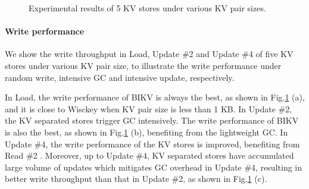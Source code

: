 \documentclass[sigconf]{acmart}
\begin{document}
\begin{figure} [!t]
	\setlength{\abovecaptionskip}{0.cm}	
	\setlength{\belowcaptionskip}{-0.cm}
	\centering
	\caption{Experimental results of 5 KV stores under various KV pair sizes.{\color{red}{why PDB is not tested in these experiments}}}
	\label{fig:kv}
\end{figure}

\paragraph*{Write performance}
We show the write throughput in Load, Update \#2 and Update \#4 of five KV stores under various KV pair size, to illustrate the write performance under random write, intensive GC and intensive update, respectively.

In Load, the write performance of BIKV is always the best, as shown in Fig.\ref{fig:kv} (a), and it is close to Wisckey when KV pair size is less than 1 KB. In Update \#2, the KV separated stores trigger GC intensively. The write performance of BIKV is also the best, as shown in Fig.\ref{fig:kv} (b), benefiting from the lightweight GC. In Update \#4, the write performance of the KV stores is improved, benefiting from Read \#2 {\color{red}{why write would benefit from read?}} . Moreover, up to Update \#4, KV separated stores have accumulated large volume of updates which mitigates GC overhead  in Update \#4, resulting in better write throughput than that in Update \#2, as shown in Fig.\ref{fig:kv} (c).
\end{document}
